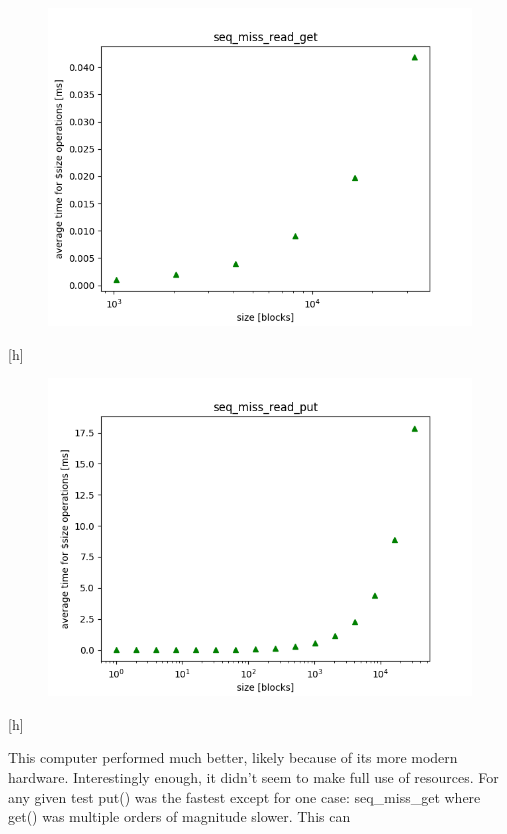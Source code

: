 \documentclass[twocolumn,11pt]{article}
\begin{document}
\begin{figure}[h]
  \includegraphics[width=\linewidth]{Pictures/HOMEPC/seq_miss_read_complete_get.png}
  \label{fig:seq_miss_read_get}
\end{figure}[h]
\begin{figure}[h]
  \includegraphics[width=\linewidth]{Pictures/HOMEPC/seq_miss_read_complete_put.png}
  \label{fig:seq_miss_read_put}
\end{figure}[h]

This computer performed much better, likely because of its more modern hardware.
Interestingly enough, it didn't seem to make full use of resources. For any
given test put() was the fastest except for one case: seq\_miss\_get where get()
was multiple orders of magnitude slower. This can
\end{document}
